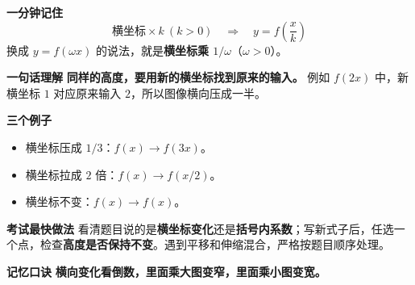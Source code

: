 \clearpage
\begin{summarybox}
  \textbf{\textcolor{CSummary}{一分钟记住}}
  \[
     \boxed{\ \text{横坐标}\times k\ (k>0)
     \quad\Longrightarrow\quad y=f\!\left(\frac{x}{k}\right)\ }
  \]
  换成 $y=f(\omega x)$ 的说法，就是\textbf{横坐标乘 $1/\omega$}（$\omega>0$）。

  \medskip
  \textbf{\textcolor{CSummary}{一句话理解}}
  \textbf{同样的高度，要用新的横坐标找到原来的输入。} 例如 $f(2x)$ 中，新横坐标 $1$ 对应原来输入 $2$，所以图像横向压成一半。

  \medskip
  \textbf{\textcolor{CSummary}{三个例子}}
  \begin{itemize}[leftmargin=*,itemsep=0.28em,topsep=0.3em]
    \item 横坐标压成 $1/3$：$f(x)\to f(3x)$。
    \item 横坐标拉成 $2$ 倍：$f(x)\to f(x/2)$。
    \item 横坐标不变：$f(x)\to f(x)$。
  \end{itemize}

  \medskip
  \textbf{\textcolor{CSummary}{考试最快做法}}
  看清题目说的是\textbf{横坐标变化}还是\textbf{括号内系数}；写新式子后，任选一个点，检查\textbf{高度是否保持不变}。遇到平移和伸缩混合，严格按题目顺序处理。

  \medskip
  \textbf{\textcolor{CSummary}{记忆口诀}}
  \textbf{横向变化看倒数，里面乘大图变窄，里面乘小图变宽。}
\end{summarybox}
